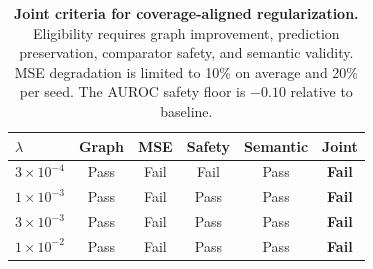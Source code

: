 \begin{table}[!t]
\centering
\caption{\textbf{Joint criteria for coverage-aligned regularization.} Eligibility requires graph improvement,
prediction preservation, comparator safety,
and semantic validity. MSE degradation is
limited to 10\% on average and 20\% per seed.
The AUROC safety floor is $-0.10$ relative
to baseline.}
\label{tab:repair_gates}
\footnotesize
\setlength{\tabcolsep}{3.1pt}
\begin{tabular}{lccccc}
\toprule
$\lambda$ & Graph & MSE & Safety & Semantic & Joint \\
\midrule
$3\times10^{-4}$ & Pass & Fail & Fail & Pass & \textbf{Fail} \\
$1\times10^{-3}$ & Pass & Fail & Pass & Pass & \textbf{Fail} \\
$3\times10^{-3}$ & Pass & Fail & Pass & Pass & \textbf{Fail} \\
$1\times10^{-2}$ & Pass & Fail & Pass & Pass & \textbf{Fail} \\
\bottomrule
\end{tabular}
\end{table}
